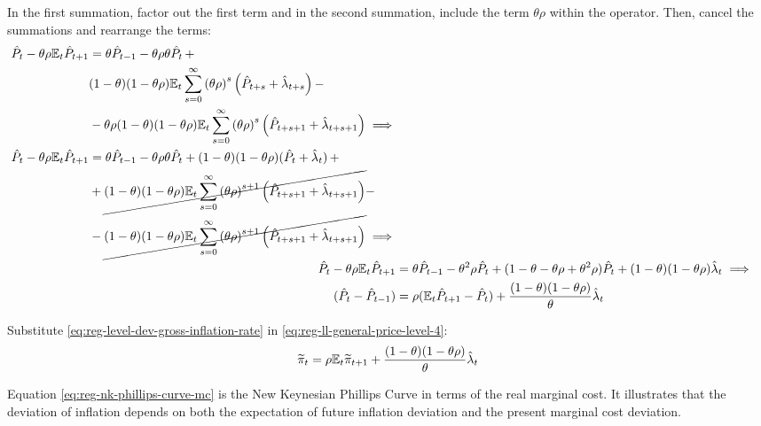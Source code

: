 \documentclass[
	thesis.tex
	]{subfiles}
\begin{document}
In the first summation, factor out the first term and in the second summation, include the term $\theta \rho$ within the operator. Then, cancel the summations and rearrange the terms:
\begin{align}
	\begin{split}
		\hat{P}_t - \theta \rho {\mathbb{E}_{t}} \hat{P}_{t+1} &= \theta \hat{P}_{t-1} - \theta \rho \theta \hat{P}_t \, + \\
		& (1-\theta) (1- \theta \rho) {\mathbb{E}_{t}} \sum_{s=0}^{\infty} \left( \theta \rho \right)^s \left( \hat{P}_{t+s} + \hat{\lambda}_{t+s} \right) -
		\\
		& - \theta \rho (1-\theta) (1- \theta \rho) {\mathbb{E}_{t}} \sum_{s=0}^{\infty} \left( \theta \rho \right)^s \left( \hat{P}_{t+s+1} + \hat{\lambda}_{t+s+1} \right) \implies \nonumber 
	\end{split} \\
	\begin{split}
		\hat{P}_t - \theta \rho {\mathbb{E}_{t}} \hat{P}_{t+1} &= \theta \hat{P}_{t-1} - \theta \rho \theta \hat{P}_t + (1-\theta) (1- \theta \rho) (\hat{P}_t + \hat{\lambda}_t) \, + 
		\\
		& + \cancel{(1-\theta) (1- \theta \rho) {\mathbb{E}_{t}} \sum_{s=0}^{\infty} \left( \theta \rho \right)^{s+1} \left( \hat{P}_{t+s+1} + \hat{\lambda}_{t+s+1} \right)} -
		\\
		& - \cancel{(1-\theta) (1- \theta \rho) {\mathbb{E}_{t}} \sum_{s=0}^{\infty} \left( \theta \rho \right)^{s+1} \left( \hat{P}_{t+s+1} + \hat{\lambda}_{t+s+1} \right)} \implies \nonumber 
	\end{split} \\
	\hat{P}_t - \theta \rho {\mathbb{E}_{t}} \hat{P}_{t+1} &= \theta \hat{P}_{t-1} - \theta^2 \rho \hat{P}_t + (1- \theta -\theta \rho + \theta^2 \rho) \hat{P}_t + (1-\theta) (1- \theta \rho) \hat{\lambda}_t \implies \nonumber \\
	(\hat{P}_t - \hat{P}_{t-1}) &= \rho ({\mathbb{E}_{t}} \hat{P}_{t+1} - \hat{P}_t) + \frac{(1-\theta) (1- \theta \rho)}{\theta} \hat{\lambda}_t
	\label{eq:reg-ll-general-price-level-4}
\end{align}

Substitute \ref{eq:reg-level-dev-gross-inflation-rate} in \ref{eq:reg-ll-general-price-level-4}:
\begin{align}
	\widetilde{\pi}_t = \rho {\mathbb{E}_{t}} \widetilde{\pi}_{t+1} + \frac{(1-\theta) (1- \theta \rho)}{\theta} \hat{\lambda}_t \label{eq:reg-nk-phillips-curve-mc}
\end{align}

Equation \ref{eq:reg-nk-phillips-curve-mc} is the New Keynesian Phillips Curve in terms of the real marginal cost. It illustrates that the deviation of inflation depends on both the expectation of future inflation deviation and the present marginal cost deviation.
\end{document}
